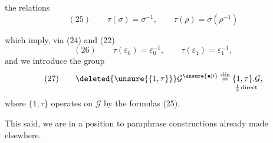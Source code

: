 
the relations
\[
(25)\qquad
\tau(\sigma)=\sigma^{-1},\qquad
\tau(\rho)=\sigma(\rho^{-1})
\]


which imply, via (24) and (22)
\[
(26)\qquad
\tau(\varepsilon_0)=\varepsilon_0^{-1},\qquad
\tau(\varepsilon_1)=\varepsilon_1^{-1},
\]
and we introduce the group
\[
(27)\qquad
\deleted{\unsure{\{1,\tau\}}}
\mathcal{G}^{\unsure{\bullet|\prime}}
\overset{\mathrm{dfn}}{=}
\underset{\frac12\,\text{direct}}{\{1,\tau\}.\mathcal{G}},
\]
where $\{1,\tau\}$ operates on $\mathcal{G}$ by the formulas (25).

This said, we are in a position to paraphrase constructions
already made elsewhere.

